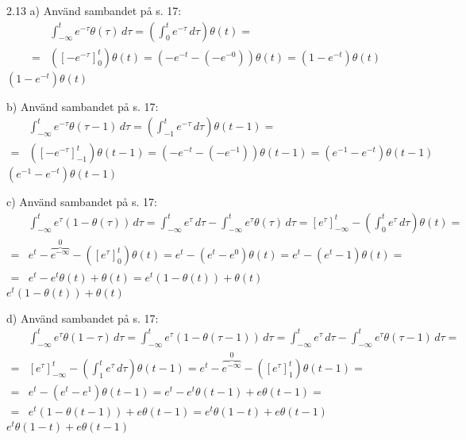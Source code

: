 \begin{task}{2.13 a)}
	Använd sambandet på s. 17:
	\begin{align*}
	&\int_{-\infty}^{t} \! e^{-\tau}\theta(\tau) \, d\tau =
	\left(\int_0^t\! e^{-\tau} \, d\tau\right)\theta(t)= \\ =
	&\left(\left[-e^{-\tau}\right]_0^t\right)\theta(t)=
	\left(-e^{-t}-\left(-e^{-0}\right)\right)\theta(t)=
	\left(1-e^{-t}\right)\theta(t)
	\end{align*}
	\ans $\left(1-e^{-t}\right)\theta(t)$
\end{task}

\begin{task}{b)}
	Använd sambandet på s. 17:
	\begin{align*}
	&\int_{-\infty}^{t} \! e^{-\tau}\theta(\tau-1) \, d\tau =
	\left(\int_{-1}^t\! e^{-\tau} \, d\tau\right)\theta(t-1)= \\ =
	&\left(\left[-e^{-\tau}\right]_{-1}^t\right)\theta(t-1)=
	\left(-e^{-t}-\left(-e^{-1}\right)\right)\theta(t-1)=
	\left(e^{-1}-e^{-t}\right)\theta(t-1)
	\end{align*}
	\ans $\left(e^{-1}-e^{-t}\right)\theta(t-1)$
\end{task}

\begin{task}{c)}
	Använd sambandet på s. 17:
	\begin{align*}
	&\int_{-\infty}^{t} \! e^{\tau}(1-\theta(\tau)) \, d\tau =
	\int_{-\infty}^{t} \! e^{\tau} \, d\tau - \int_{-\infty}^{t} \! e^{\tau}\theta(\tau) \, d\tau=
	\left[e^{\tau}\right]_{-\infty}^t - \left(\int_{0}^t\! e^{\tau} \, d\tau\right)\theta(t)= \\ =
	&e^t-\overbrace{e^{-\infty}}^0-\left(\left[e^{\tau}\right]_{0}^t\right)\theta(t)=
	e^t-\left(e^{t}-e^{0}\right)\theta(t)=
	e^t-\left(e^{t}-1\right)\theta(t)= \\ =
	&e^t-e^{t}\theta(t)+\theta(t)=
	e^t(1-\theta(t))+\theta(t)
	\end{align*}
	\ans $e^t(1-\theta(t))+\theta(t)$
\end{task}

\begin{task}{d)}
	Använd sambandet på s. 17:
	\begin{align*}
	&\int_{-\infty}^{t} \! e^{\tau}\theta(1-\tau) \, d\tau =
	\int_{-\infty}^{t} \! e^{\tau}(1-\theta(\tau-1)) \, d\tau =
	\int_{-\infty}^{t} \! e^{\tau} \, d\tau - \int_{-\infty}^{t} \! e^{\tau}\theta(\tau-1) \, d\tau= \\ =
	&\left[e^{\tau}\right]_{-\infty}^t - \left(\int_{1}^t\! e^{\tau} \, d\tau\right)\theta(t-1)=
	e^t-\overbrace{e^{-\infty}}^0-\left(\left[e^{\tau}\right]_{1}^t\right)\theta(t-1)= \\ =
	&e^t-\left(e^{t}-e^{1}\right)\theta(t-1)=
	e^t-e^{t}\theta(t-1)+e\theta(t-1)= \\ =
	&e^t(1-\theta(t-1))+e\theta(t-1)=
	e^t\theta(1-t)+e\theta(t-1)
	\end{align*}
	\ans $e^t\theta(1-t)+e\theta(t-1)$
\end{task}

